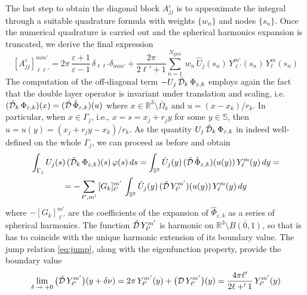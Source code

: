The last step to obtain the diagonal block $A_{jj}^\varepsilon$ is to approximate the integral through a suitable quadrature formula with weights $\{w_n\}$ and nodes $\{ s_n\}$. Once the numerical quadrature is carried out and the spherical harmonics expansion is truncated, we derive the final expression
\begin{equation}\label{eq:ajj}
[A_{jj}^\varepsilon]_{\ell \ell'}^{mm'} = 2\pi \, \frac{\varepsilon+1}{\varepsilon-1} \,  \delta_{\ell \ell'} \delta_{mm'} + \frac{2\pi}{2\ell'+1} \sum_{n=1}^{N_\text{grid}} \, w_n \, \hat{U}_j(s_n)  \, Y_{\ell'}^{m'}(s_n)\,  Y_\ell^m(s_n)
\end{equation}
The computation of the off-diagonal term $-U_j \, \tilde{\mathcal{D}}_k \, \Phi_{\varepsilon,k}$ employs again the fact that the double layer operator is invariant under translation and scaling, i.e. $(\tilde{\mathcal{D}}_k \, \Phi_{\varepsilon,k} )(x) = (\tilde{\mathcal{D}} \, \hat{\Phi}_{\varepsilon,k})(u)$ where $x \in \mathbb{R}^3 \setminus \overline{\Omega}_k$ and $u = (x -x_k)/ r_k$. In particular, when $x \in \Gamma_j$, i.e., $x = s = x_j + r_j y$ for some $y \in \mathbb{S}$, then $u = u(y) = (x_j + r_j y -x_k)/r_k$. As the quantity $U_j \, \tilde{\mathcal{D}}_k \, \Phi_{\varepsilon,k}$ in indeed well-defined on the whole $\Gamma_j$, we can proceed as before and obtain
\begin{multline*}
\int_{\Gamma_j}U_j(s) \, (\tilde{\cD}_k \, \Phi_{\varepsilon,k})(s) \, \varphi(s) \, ds
 =  \int_{\mathbb{S}^2} \hat{U}_j(y) \, (\tilde{\cD} \, \hat{\Phi}_{\varepsilon,k})(u(y)) \, Y_{\ell}^{m}(y) \, dy = \\ %
= -\sum_{\ell',m'} \, [G_k]_{\ell'}^{m'} \,  \int_{\mathbb{S}^2} \hat{U}_j(y) \, (\tilde{\cD} \, Y_{\ell'}^{m'})(u(y)) \, Y_{\ell}^{m}(y) \, dy 
\end{multline*}
where $-[G_k]_{\ell'}^{m'}$ are the coefficients of the expansion of $ \hat{\Phi}_{\varepsilon,k}$ as a series of spherical harmonics. The function $\tilde{\mathcal{D}} \, Y_{\ell'}^{m'}$ is harmonic on $\mathbb{R}^3 \setminus \overline{B(0,1)}$, so that is has to coincide with the unique harmonic extension of its boundary value. The jump relation \eqref{eq:jump}, along with the eigenfunction property, provide the boundary value
\[
\lim_{\delta \; \to \; + 0} \big(\tilde{\mathcal{D}} \, Y_{\ell'}^{m'}\big)(y + \delta \nu) =  2\pi \,Y_{\ell'}^{m'}(y)+ \big( \mathcal{D} \, Y_{\ell'}^{m'} \big)(y) = \frac{4 \pi \ell'}{2 \ell +' 1} \, Y_{\ell'}^{m'}(y)
\]
